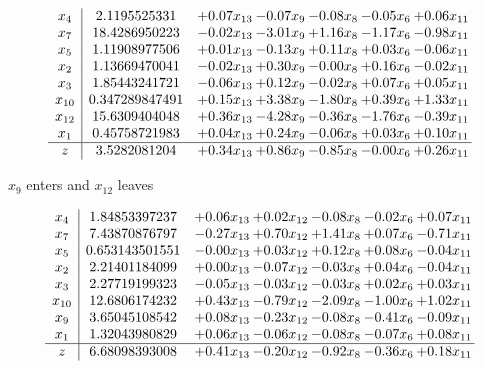 \documentclass[9pt]{article}
\begin{document}
 \[\begin{array}{c| c c@{\hskip 2pt} c@{\hskip 2pt} c@{\hskip 2pt} c@{\hskip 2pt} c@{\hskip 2pt} }
 x_{4}   &  2.1195525331 & +  0.07 x_{13} & -0.07 x_{9} & -0.08 x_{8} & -0.05 x_{6} & +  0.06 x_{11}\\
 x_{7}   &  18.4286950223 & -0.02 x_{13} & -3.01 x_{9} & +  1.16 x_{8} & -1.17 x_{6} & -0.98 x_{11}\\
 x_{5}   &  1.11908977506 & +  0.01 x_{13} & -0.13 x_{9} & +  0.11 x_{8} & +  0.03 x_{6} & -0.06 x_{11}\\
 x_{2}   &  1.13669470041 & -0.02 x_{13} & +  0.30 x_{9} & -0.00 x_{8} & +  0.16 x_{6} & -0.02 x_{11}\\
 x_{3}   &  1.85443241721 & -0.06 x_{13} & +  0.12 x_{9} & -0.02 x_{8} & +  0.07 x_{6} & +  0.05 x_{11}\\
 x_{10}   &  0.347289847491 & +  0.15 x_{13} & +  3.38 x_{9} & -1.80 x_{8} & +  0.39 x_{6} & +  1.33 x_{11}\\
 x_{12}   &  15.6309404048 & +  0.36 x_{13} & -4.28 x_{9} & -0.36 x_{8} & -1.76 x_{6} & -0.39 x_{11}\\
 x_{1}   &  0.45758721983 & +  0.04 x_{13} & +  0.24 x_{9} & -0.06 x_{8} & +  0.03 x_{6} & +  0.10 x_{11}\\
\hline
z    &  3.5282081204 & +  0.34 x_{13} & +  0.86 x_{9} & -0.85 x_{8} & -0.00 x_{6} & +  0.26 x_{11}\\
\end{array}\]


 $ x_{9} $ enters and $ x_{12} $ leaves 

 \[\begin{array}{c| c c@{\hskip 2pt} c@{\hskip 2pt} c@{\hskip 2pt} c@{\hskip 2pt} c@{\hskip 2pt} }
 x_{4}   &  1.84853397237 & +  0.06 x_{13} & +  0.02 x_{12} & -0.08 x_{8} & -0.02 x_{6} & +  0.07 x_{11}\\
 x_{7}   &  7.43870876797 & -0.27 x_{13} & +  0.70 x_{12} & +  1.41 x_{8} & +  0.07 x_{6} & -0.71 x_{11}\\
 x_{5}   &  0.653143501551 & -0.00 x_{13} & +  0.03 x_{12} & +  0.12 x_{8} & +  0.08 x_{6} & -0.04 x_{11}\\
 x_{2}   &  2.21401184099 & +  0.00 x_{13} & -0.07 x_{12} & -0.03 x_{8} & +  0.04 x_{6} & -0.04 x_{11}\\
 x_{3}   &  2.27719199323 & -0.05 x_{13} & -0.03 x_{12} & -0.03 x_{8} & +  0.02 x_{6} & +  0.03 x_{11}\\
 x_{10}   &  12.6806174232 & +  0.43 x_{13} & -0.79 x_{12} & -2.09 x_{8} & -1.00 x_{6} & +  1.02 x_{11}\\
 x_{9}   &  3.65045108542 & +  0.08 x_{13} & -0.23 x_{12} & -0.08 x_{8} & -0.41 x_{6} & -0.09 x_{11}\\
 x_{1}   &  1.32043980829 & +  0.06 x_{13} & -0.06 x_{12} & -0.08 x_{8} & -0.07 x_{6} & +  0.08 x_{11}\\
\hline
z    &  6.68098393008 & +  0.41 x_{13} & -0.20 x_{12} & -0.92 x_{8} & -0.36 x_{6} & +  0.18 x_{11}\\
\end{array}\]
\end{document}
